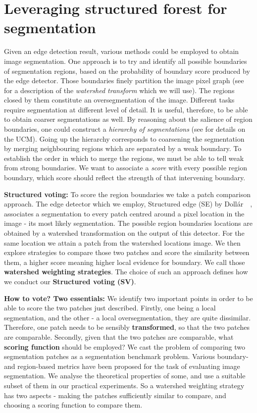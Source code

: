 \chapter{Leveraging structured forest for segmentation}
\label{Chapter4}
Given an edge detection result, various methods could be employed to obtain image segmentation.  One approach is to try and identify all possible boundaries of segmentation regions, based on the probability of boundary score produced by the edge detector. Those boundaries %
finely partition the image pixel graph (see  for a description of the \textit{watershed transform} which we will use). The regions closed by them constitute an oversegmentation of the image. Different tasks require segmentation at different level of detail. It is useful, therefore, to be able to obtain coarser segmentations as well. 
By reasoning about the salience of region boundaries, one could construct a \textit{hierarchy of segmentations} (see  for details on the UCM). Going up the hierarchy corresponds to coarsening the segmentation by merging neighbouring regions which are separated by a weak boundary. To establish the order in which to merge the regions, we must be able to tell weak from strong boundaries. We want to associate a \textit{score} with every possible region boundary, which score should reflect the strength of that intervening boundary.

\textbf{Structured voting:} To score the region boundaries we take a patch comparison approach. The edge detector which we employ, Structured edge (SE) by Doll\'ar~\etal~\cite{DollarICCV13edges}, associates a segmentation to every patch centred around a pixel location in the image - its most likely segmentation. The possible region boundaries locations are obtained by a watershed transformation on the output of this detector. For the same location we attain a patch from the watershed locations image. We then explore strategies to compare those two patches and score the similarity between them, a higher score meaning higher local evidence for boundary. We call those \textbf{watershed weighting strategies}. The choice of such an approach defines how we conduct our \textbf{Structured voting (SV)}.

\textbf{How to vote? Two essentials:} We identify two important points in order to be able to score the two patches just described. 
Firstly, one being a local segmentation, and the other - a local oversegmentation, they are quite dissimilar. Therefore, one patch needs to be sensibly \textbf{transformed}, so that the two patches are comparable. 
Secondly, given that the two patches are comparable, what \textbf{scoring function} should be employed? We cast the problem of comparing two segmentation patches as a segmentation benchmark problem. Various boundary- and region-based metrics have been proposed for the task of evaluating image segmentation. We analyse the theoretical properties of some, and use a suitable %
subset of them in our practical experiments. 
So a watershed weighting strategy has two aspects - making the patches sufficiently similar to compare, and choosing a scoring function to compare them.

